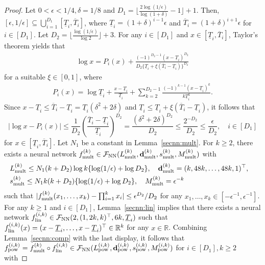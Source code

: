 \documentclass[twoside,11pt]{article}
\def\cF{\mathcal F}
\newcommand{\bd}{{\bf d}}
\newcommand{\bbR}{{\mathbb R}}
\newcommand{\be}{\begin{equation}}
\newcommand{\ee}{\end{equation}}
\newcommand{\bean}{\setlength\arraycolsep{1pt}\begin{eqnarray*}}
\newcommand{\eean}{\end{eqnarray*}}
\begin{document}
\begin{proof}
Let $0 < \epsilon < 1/4, \delta = 1/8$ and $D_1 = \lfloor \frac{2 \log (1/\epsilon)}{\log (1+\delta)} -1 \rfloor +1$. Then, $[\epsilon, 1/\epsilon] \subseteq \bigcup_{i=1}^{D_1} [\underline{T}_i,\overline{T}_i] $, where $\underline{T}_i = (1+\delta)^{i-1}\epsilon$ and $\overline{T}_i = (1+\delta)^{i+1}\epsilon$ for $i \in [D_1]$. Let $D_2 = \lfloor \frac{ \log (1/\epsilon)}{\log 2} \rfloor + 3 $. For any $i \in [D_1]$ and $ x \in [\underline{T}_i,\overline{T}_i]$, Taylor's theorem yields that
\bean
\log x = P_{i}(x) + \frac{(-1)^{D_2-1} (x-\underline{T}_i)^{D_2} }{D_2\{\underline{T}_i + \xi (\overline{T}_i - \underline{T}_i)\}^{D_2}}
\eean
for a suitable $\xi \in [0,1]$, where 
\bean
P_{i}(x) = \log \underline{T}_i + \frac{x-\underline{T}_i}{\underline{T}_i} +\sum_{k=2}^{D_2-1} \frac{(-1)^{k-1}   (x -\underline{T}_i)^{k}  }{k\underline{T}_i^{k}}.
\eean
Since $x-\underline{T}_i \leq \overline{T}_i - \underline{T}_i =  \underline{T}_i (\delta^2 + 2\delta)$ and $\underline{T}_i \leq \underline{T}_i + \xi (\overline{T}_i - \underline{T}_i)$, it follows that
\be
\left\vert \log x - P_{i}(x) \right\vert \leq \frac{1}{D_2}\left( \frac{\overline{T}_i-\underline{T}_i}{ \underline{T}_i } \right)^{D_2} =  \frac{\left(\delta^2+ 2\delta \right)^{D_2}}{D_2} \leq \frac{2^{-D_2}}{D_2} \leq \frac{\epsilon}{D_2}, \quad i \in [D_1] \label{eq:nnlog}
\ee
for $x \in [\underline{T}_i,\overline{T}_i]$.
Let $N_1$ be a constant in Lemma~\ref{secnn:mult}. For $k \geq 2$, there exists a neural network $f_{\rm mult}^{(k)} \in \cF_{\rm NN}(L_{\rm mult}^{(k)}, \bd_{\rm mult}^{(k)}, s_{\rm mult}^{(k)}, M_{\rm mult}^{(k)})$ with 
\be \begin{split}
& L_{\rm mult}^{(k)} \leq N_1  (k+D_2) \log k \{ \log (1/\epsilon) + \log D_2 \}, \quad \bd_{\rm mult}^{(k)} = (k,48k,\ldots,48k,1)^{\top}, \quad
\\
& s_{\rm mult}^{(k)} \leq N_1 k(k+D_2) \{ \log(1/\epsilon) + \log D_2 \}, \quad M_{\rm mult}^{(k)} = \epsilon^{-k} \label{eq:nnmultcomp}
\end{split} \ee
such that $\vert f_{\rm mult}^{(k)}(x_1,\ldots,x_k) - \prod_{i=1}^{k} x_i \vert \leq \epsilon^{D_2}/D_2$ for any $x_1,\ldots,x_k \in [-\epsilon^{-1},\epsilon^{-1}]$.
For any $k \geq 1$ and $i \in [D_1]$, Lemma~\ref{secnn:lin} implies that there exists a neural network $f_{\rm lin}^{(i,k)} \in \cF_{\rm NN}(2,(1,2k,k)^{\top}, 6k, \underline{T}_i)$ such that $f_{\rm lin}^{(i,k)}(x) = (x-\underline{T}_i,\ldots,x-\underline{T}_i)^{\top} \in \bbR^{k}$ for any $x \in \bbR$. 
Combining Lemma~\ref{secnn:comp} with the last display, it follows that $f_{\rm pow}^{(i,k)} = f_{\rm mult}^{(k)} \circ f_{\rm lin}^{(i,k)} \in \cF_{\rm NN}(L_{\rm pow}^{(i,k)},\bd_{\rm pow}^{(i,k)},s_{\rm pow}^{(i,k)}, M_{\rm pow}^{(i,k)})$ for $i \in [D_{1}], k \geq 2$ with

\end{proof}
\end{document}
